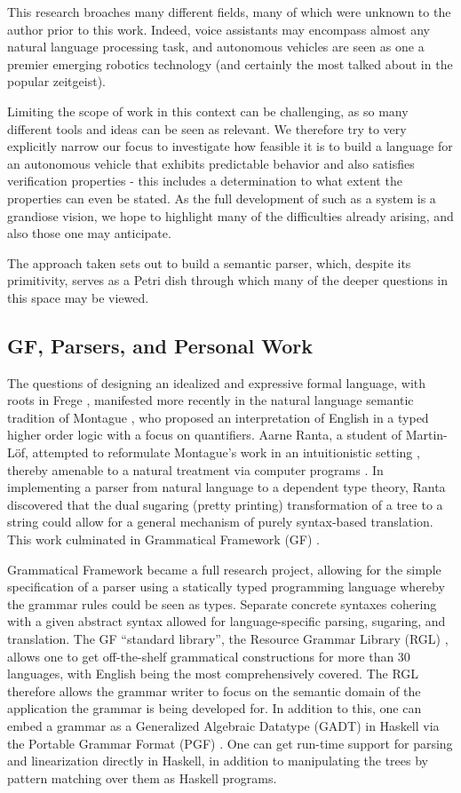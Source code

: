 \documentclass[a4paper, 11pt]{article}
\begin{document}
This research broaches many different fields, many of which were
unknown to the author prior to this work. Indeed, voice assistants may
encompass almost any natural language processing task, and autonomous vehicles are
seen as one a premier emerging robotics technology (and certainly the most talked
about in the popular zeitgeist).

Limiting the scope of work in this context can be challenging, as so many
different tools and ideas can be seen as relevant. We therefore try to very
explicitly narrow our focus to investigate how feasible it is to build a
language for an autonomous vehicle that exhibits predictable behavior and also
satisfies verification properties - this includes a determination to what extent
the properties can even be stated. As the full development of such as a system
is a grandiose vision, we hope to highlight many of the difficulties already
arising, and also those one may anticipate.

The approach taken sets out to build a semantic parser, which, despite its
primitivity, serves as a Petri dish through which many of the deeper questions
in this space may be viewed.

\subsection{GF, Parsers, and Personal Work}

The questions of designing an idealized and expressive formal language, with
roots in Frege \cite{frege79}, manifested more recently in the natural language
semantic tradition of Montague \cite{Montague1973}, who proposed an
interpretation of English in a typed higher order logic with a focus on
quantifiers. Aarne Ranta, a student of Martin-Löf, attempted to reformulate
Montague's work in an intuitionistic setting \cite{ranta1994type}, thereby
amenable to a natural treatment via computer programs \cite{ml79}. In
implementing a parser from natural language to a dependent type theory, Ranta
discovered that the dual sugaring (pretty printing) transformation of a tree to
a string could allow for a general mechanism of purely syntax-based translation.
This work culminated in Grammatical Framework (GF) \cite{ranta_2004}.

Grammatical Framework became a full research project, allowing for the simple
specification of a parser using a statically typed programming language whereby
the grammar rules could be seen as types. Separate concrete syntaxes cohering
with a given abstract syntax allowed for language-specific parsing, sugaring,
and translation. The GF ``standard library'', the Resource Grammar Library (RGL)
\cite{ranta2009rgl}, allows one to get off-the-shelf grammatical constructions
for more than 30 languages, with English being the most comprehensively covered. The RGL
therefore allows the grammar writer to focus on the semantic domain of the
application the grammar is being developed for. In addition to this, one can
embed a grammar as a Generalized Algebraic Datatype (GADT) in Haskell via the
Portable Grammar Format (PGF) \cite{angelov2010pgf}. One can get run-time
support for parsing and linearization directly in Haskell, in addition to
manipulating the trees by pattern matching over them as Haskell programs.
\end{document}
